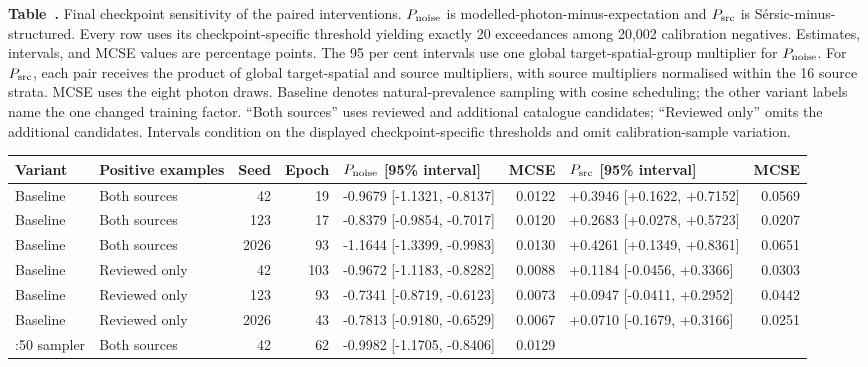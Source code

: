 \medskip
\begin{table}
\label{tab:checkpoint_panel_interventions}
\noindent\textbf{Table~\thetable.} Final checkpoint sensitivity of the paired
interventions. \(P_{\rm noise}\) is
modelled-photon-minus-expectation and
\(P_{\rm src}\) is S\'{e}rsic-minus-structured. Every row uses its
checkpoint-specific threshold yielding exactly 20 exceedances among 20,002
calibration negatives.
Estimates, intervals, and MCSE values are percentage points. The 95 per cent
intervals use one global target-spatial-group multiplier for
\(P_{\rm noise}\). For \(P_{\rm src}\), each pair receives the product of
global target-spatial and source multipliers, with source multipliers
normalised within the 16 source strata. MCSE uses the eight photon draws.
Baseline denotes natural-prevalence sampling with cosine scheduling; the
other variant labels name the one changed training factor. ``Both sources''
uses reviewed and additional catalogue candidates; ``Reviewed only'' omits
the additional candidates.
Intervals condition on the displayed checkpoint-specific thresholds and omit
calibration-sample variation.
\begin{center}
\scriptsize
\begin{tabular}{L{0.095\textwidth}L{0.075\textwidth}r r
                L{0.23\textwidth}r L{0.23\textwidth}r}
\toprule
Variant & Positive examples & Seed & Epoch &
\(P_{\rm noise}\) [95\% interval] & MCSE &
\(P_{\rm src}\) [95\% interval] & MCSE \\
\midrule
Baseline & Both sources & 42 & 19 & -0.9679 [-1.1321, -0.8137] & 0.0122 &
+0.3946 [+0.1622, +0.7152] & 0.0569 \\
Baseline & Both sources & 123 & 17 & -0.8379 [-0.9854, -0.7017] & 0.0120 &
+0.2683 [+0.0278, +0.5723] & 0.0207 \\
Baseline & Both sources & 2026 & 93 & -1.1644 [-1.3399, -0.9983] & 0.0130 &
+0.4261 [+0.1349, +0.8361] & 0.0651 \\
\addlinespace
Baseline & Reviewed only & 42 & 103 & -0.9672 [-1.1183, -0.8282] & 0.0088 &
+0.1184 [-0.0456, +0.3366] & 0.0303 \\
Baseline & Reviewed only & 123 & 93 & -0.7341 [-0.8719, -0.6123] & 0.0073 &
+0.0947 [-0.0411, +0.2952] & 0.0442 \\
Baseline & Reviewed only & 2026 & 43 & -0.7813 [-0.9180, -0.6529] & 0.0067 &
+0.0710 [-0.1679, +0.3166] & 0.0251 \\
:50 sampler & Both sources & 42 & 62 & -0.9982 [-1.1705, -0.8406] & 0.0129 &

\end{tabular}
\end{center}
\end{table}
